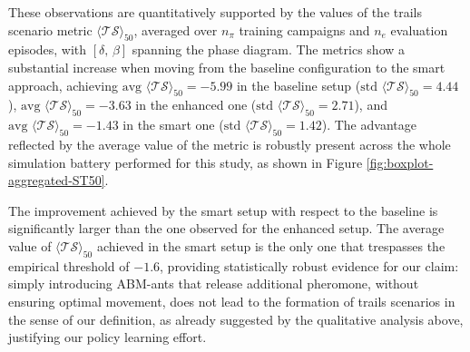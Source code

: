 \documentclass[openacc]{rsproca_new}%
\begin{document}
These observations are quantitatively supported by %
 the values of the trails scenario metric %
 $\langle \mathcal{TS} \rangle_{50}$, averaged over $n_{\pi}$ training campaigns and $n_{e}$ evaluation episodes, with $\left[ \delta, \, \beta \right]$ spanning the phase diagram. %
 The metrics show a substantial increase when moving from the baseline configuration to the smart approach, achieving $\text{avg}\,\,\langle \mathcal{TS} \rangle_{50} = -5.99$ in the baseline setup ($\text{std}\,\,\langle \mathcal{TS} \rangle_{50} = 4.44$), $\text{avg}\,\, \langle \mathcal{TS} \rangle_{50} = -3.63$ in the enhanced one ($\text{std}\,\,\langle \mathcal{TS} \rangle_{50} = 2.71$), and $\text{avg}\,\, \langle \mathcal{TS} \rangle_{50} = -1.43$ in the smart one ($\text{std}\,\,\langle \mathcal{TS} \rangle_{50} = 1.42$). The advantage reflected by the average value of the metric is robustly present across the whole simulation battery performed for this study, as shown in Figure \ref{fig:boxplot-aggregated-ST50}. 
 
The improvement achieved by the smart setup with respect to the baseline is significantly larger than the one observed for the enhanced setup. The average value of $\langle \mathcal{TS} \rangle_{50}$ achieved in the smart setup is the only one that trespasses the empirical threshold of $-1.6$, providing statistically robust evidence for our claim: simply introducing ABM-ants that release additional pheromone, without ensuring optimal movement, does not lead to the formation of trails scenarios in the sense of our definition, as already suggested by the qualitative analysis above, justifying our policy learning effort. 
\end{document}
